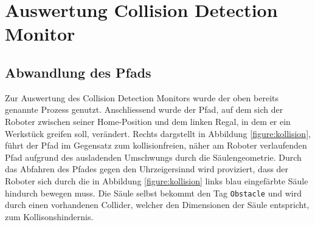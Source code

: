 \section{Auswertung Collision Detection Monitor}
\label{sec:collisionauswertung}

\subsection{Abwandlung des Pfads} Zur Auswertung des Collision Detection
Monitors wurde der oben bereits genannte Prozess genutzt. Anschliessend wurde
der Pfad, auf dem sich der Roboter zwischen seiner Home-Position und dem linken
Regal, in dem er ein Werkstück greifen soll, verändert. Rechts dargstellt in
Abbildung \ref{figure:kollision}, führt der Pfad im Gegensatz zum
kollisionfreien, näher am Roboter verlaufenden Pfad aufgrund des ausladenden
Umschwungs durch die Säulengeometrie. Durch das Abfahren des Pfades gegen den
Uhrzeigersinnd wird proviziert, dass der Roboter sich durch die in Abbildung
\ref{figure:kollision} links blau eingefärbte Säule hindurch bewegen muss. Die Säule selbst
bekommt den Tag \texttt{Obstacle} und wird durch einen vorhandenen Collider,
welcher den Dimensionen der Säule entspricht, zum Kollisonshindernis.

